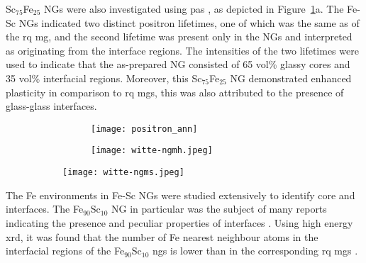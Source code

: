 Sc$_{75}$Fe$_{25}$ NGs were also investigated using \gls{pas} \cite{Fang2012}, as depicted in Figure~\ref{f:ng-evidence}a. The Fe-Sc NGs indicated two distinct positron lifetimes, one of which was the same as of the \gls{rq} \gls{mg}, and the second lifetime was present only in the NGs and interpreted as originating from the interface regions. The intensities of the two lifetimes were used to indicate that the as-prepared NG consisted of 65 vol\% glassy cores and 35 vol\% interfacial regions. Moreover, this Sc$_{75}$Fe$_{25}$  NG demonstrated enhanced plasticity in comparison to \gls{rq} \gls{mg}s, this was also attributed to the presence of glass-glass interfaces. \par

\begin{figure}[!h] \centering
	\begin{subfigure}{0.4\linewidth}
		\begin{subfigure}{\linewidth}
		\texttt{[image: positron\_ann]} \subcaption{}
		\end{subfigure}%
		\vfill	
		\begin{subfigure}{\linewidth}
		\texttt{[image: witte-ngmh.jpeg]} \subcaption{}
		\end{subfigure}%
	\end{subfigure}%
	\hfill
	\begin{subfigure}{0.6\linewidth} \centering
		\texttt{[image: witte-ngms.jpeg]} \subcaption{}
	\end{subfigure}%

	\label{f:ng-evidence}
\end{figure}

The Fe environments in Fe-Sc NGs were studied extensively to identify core and interfaces. The Fe$_{90}$Sc$_{10}$ NG in particular was the subject of many reports indicating the presence and peculiar properties of interfaces \cite{Ghafari2012,Ghafari2012c,Witte2013,Wang2016,Wang2017}. Using high energy \gls{xrd}, it was found that the number of Fe nearest neighbour atoms in the interfacial regions of the Fe$_{90}$Sc$_{10}$ \gls{ng}s is lower than in the corresponding \gls{rq} \gls{mg}s \cite{Ghafari2012c}. \par

